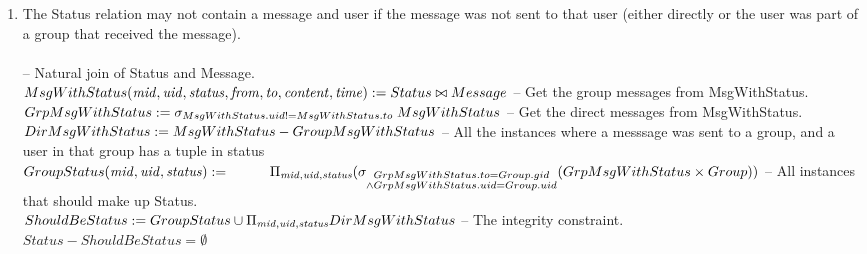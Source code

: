 \documentclass{article}
\newcommand{\var}[1]{\mathit{#1}}
\begin{document}
\begin{enumerate}
 
\item
The Status relation may not contain a message and user if the message was not sent to that user (either directly or the user was part of a group that received the message). \\\\ [5pt]
{\large
\hspace*{1cm} -- Natural join of Status and Message.\\ [5pt]
$
MsgWithStatus(\var{mid}, \var{uid}, \var{status}, \var{from}, \var{to}, \var{content}, \var{time}) := 
	Status \bowtie Message \\\\ [5pt]
$ 
\hspace*{1cm} -- Get the group messages from MsgWithStatus. \\ [5pt]
$
GrpMsgWithStatus :=
	\sigma_{MsgWithStatus.uid != MsgWithStatus.to} \; MsgWithStatus \\\\ [5pt]
$
\hspace*{1cm} -- Get the direct messages from MsgWithStatus. \\ [5pt]
$
DirMsgWithStatus :=
	MsgWithStatus - GroupMsgWithStatus \\\\ [5pt]
$
\hspace*{1cm} -- All the instances where a messsage was sent to a group, and a user in that \hspace*{1cm}group has a tuple in status \\ [5pt]
$
GroupStatus(\var{mid}, \var{uid}, \var{status}) := \\ [5pt]
	\hspace*{1cm}\Pi_{\var{mid}, \var{uid}, \var{status}}
	(\sigma_{\substack{GrpMsgWithStatus.to = Group.gid \\
			\wedge GrpMsgWithStatus.uid = Group.uid}}
			(GrpMsgWithStatus \times Group)) \\\\\\ [5pt]
$
\hspace*{1cm} -- All instances that should make up Status. \\ [5pt]
$
ShouldBeStatus :=
	GroupStatus \cup
	\Pi_{\var{mid}, \var{uid}, \var{status}} DirMsgWithStatus \\\\ [5pt]
$
\hspace*{1cm} -- The integrity constraint. \\ [5pt]
$
Status - ShouldBeStatus = \emptyset
$
}
\end{enumerate}
\end{document}
